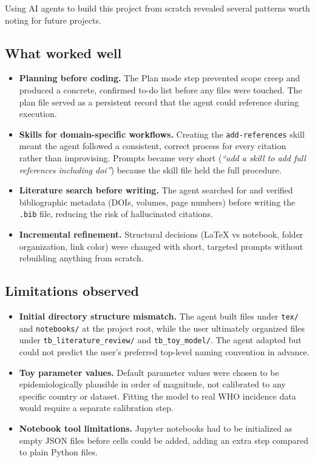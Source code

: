 \documentclass[11pt]{article}
\begin{document}
Using AI agents to build this project from scratch revealed several patterns worth noting for future projects.

\subsection{What worked well}

\begin{itemize}
  \item \textbf{Planning before coding.} The Plan mode step prevented scope creep and produced a concrete, confirmed to-do list before any files were touched. The plan file served as a persistent record that the agent could reference during execution.

  \item \textbf{Skills for domain-specific workflows.} Creating the \texttt{add-references} skill meant the agent followed a consistent, correct process for every citation rather than improvising. Prompts became very short (\textit{``add a skill to add full references including doi''}) because the skill file held the full procedure.

  \item \textbf{Literature search before writing.} The agent searched for and verified bibliographic metadata (DOIs, volumes, page numbers) before writing the \texttt{.bib} file, reducing the risk of hallucinated citations.

  \item \textbf{Incremental refinement.} Structural decisions (LaTeX vs notebook, folder organization, link color) were changed with short, targeted prompts without rebuilding anything from scratch.
\end{itemize}

\subsection{Limitations observed}

\begin{itemize}
  \item \textbf{Initial directory structure mismatch.} The agent built files under \texttt{tex/} and \texttt{notebooks/} at the project root, while the user ultimately organized files under \texttt{tb\_literature\_review/} and \texttt{tb\_toy\_model/}. The agent adapted but could not predict the user's preferred top-level naming convention in advance.

  \item \textbf{Toy parameter values.} Default parameter values were chosen to be epidemiologically plausible in order of magnitude, not calibrated to any specific country or dataset. Fitting the model to real WHO incidence data would require a separate calibration step.

  \item \textbf{Notebook tool limitations.} Jupyter notebooks had to be initialized as empty JSON files before cells could be added, adding an extra step compared to plain Python files.
\end{itemize}
\end{document}
